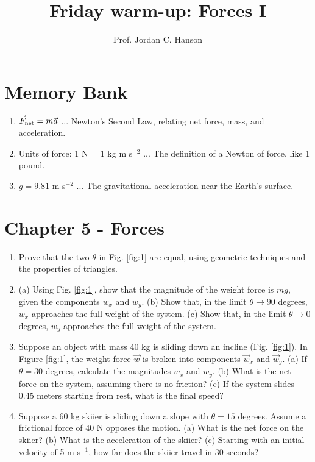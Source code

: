 \documentclass{article}
\begin{document}
\twocolumn

\title{Friday warm-up: Forces I}
\author{Prof. Jordan C. Hanson}

\maketitle

\section{Memory Bank}

\begin{enumerate}
\item $\vec{F}_{\rm net} = m \vec{a}$ ... Newton's Second Law, relating net force, mass, and acceleration.
\item Units of force: 1 N = 1 kg m s$^{-2}$ ... The definition of a Newton of force, like 1 pound.
\item $g = 9.81$ m s$^{-2}$ ... The gravitational acceleration near the Earth's surface.
\end{enumerate}

\section{Chapter 5 - Forces}

\begin{enumerate}
\item Prove that the two $\theta$ in Fig. \ref{fig:1} are equal, using geometric techniques and the properties of triangles. \\ \vspace{4cm}
\item (a) Using Fig. \ref{fig:1}, show that the magnitude of the weight force is $mg$, given the components $w_x$ and $w_y$. (b) Show that, in the limit $\theta \to 90$ degrees, $w_x$ approaches the full weight of the system.  (c) Show that, in the limit $\theta \to 0$ degrees, $w_y$ approaches the full weight of the system. \\ \vspace{5cm}
\item Suppose an object with mass 40 kg is sliding down an incline (Fig. \ref{fig:1}).  In Figure \ref{fig:1}, the weight force $\vec{w}$ is broken into components $\vec{w}_x$ and $\vec{w}_y$.  (a) If $\theta = 30$ degrees, calculate the magnitudes $w_x$ and $w_y$.  (b) What is the net force on the system, assuming there is no friction? (c) If the system slides 0.45 meters starting from rest, what is the final speed? \\ \vspace{4cm}
\item Suppose a 60 kg skiier is sliding down a slope with $\theta = 15$ degrees.  Assume a frictional force of 40 N opposes the motion. (a) What is the net force on the skiier?  (b) What is the acceleration of the skiier? (c)  Starting with an initial velocity of 5 m s$^{-1}$, how far does the skiier travel in 30 seconds? \\ \vspace{4cm}
\end{enumerate}
\end{document}
